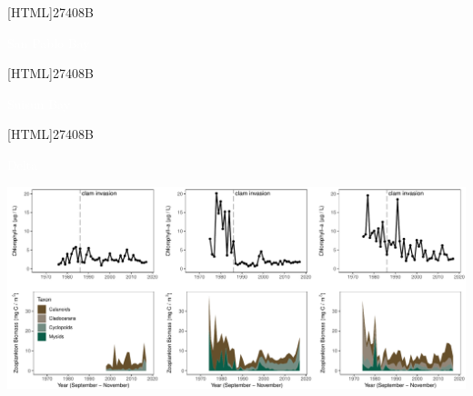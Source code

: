 \documentclass[]{article}\usepackage[]{graphicx}\usepackage[]{color}
\makeatletter
\def\maxwidth{ %
  \ifdim\Gin@nat@width>\linewidth
    \linewidth
  \else
    \Gin@nat@width
  \fi
}
\makeatother
\begin{document}
\begin{Row}
   \begin{Cell}{1}
			\hspace{42pt}
			\begin{minipage}{195pt}
				[HTML]{27408B}{\parbox[c][12pt]{\textwidth}{
					\begin{center}
						{\LARGE \textcolor{white}{San Pablo Bay}}
					\end{center}
				}}
			\end{minipage}%
			\hspace{62pt}
			\begin{minipage}{195pt}
				[HTML]{27408B}{\parbox[c][12pt]{\textwidth}{
					\begin{center}
						{\LARGE \textcolor{white}{Suisun Bay}}
					\end{center}
				}}
			\end{minipage}%
			\hspace{62pt}
			\begin{minipage}{195pt}
				[HTML]{27408B}{\parbox[c][12pt]{\textwidth}{
					\begin{center}
						{\LARGE \textcolor{white}{Delta}}
					\end{center}
				}}
			\end{minipage}
   \end{Cell}
\end{Row}

\vspace{-0.2cm}

\begin{Row}
    \begin{Cell}{1}


{\centering \includegraphics[width=\maxwidth]{figures/plankton_main_fig-1} 

}



		\end{Cell}
\end{Row}
\end{document}
